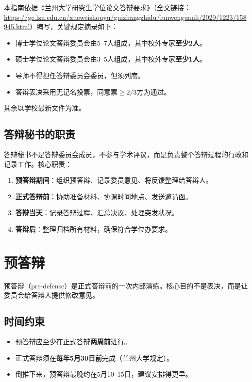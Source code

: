 \documentclass[12pt,a4paper,openany]{ctexbook}
\begin{document}
本指南依据《兰州大学研究生学位论文答辩要求》（全文链接：\url{https://ge.lzu.edu.cn/xueweishouyu/guizhangzhidu/lunwenguanli/2020/1223/158945.html}）编写，关键规定摘录如下：

\begin{itemize}
  \item 博士学位论文答辩委员会由5--7人组成，其中校外专家\textbf{至少2人}。
  \item 硕士学位论文答辩委员会由3--5人组成，其中校外专家\textbf{至少1人}。
  \item 导师不得担任答辩委员会委员，但须列席。
  \item 答辩表决采用无记名投票，同意票$\geq 2/3$方为通过。
\end{itemize}

其余以学校最新文件为准。

\section{答辩秘书的职责}

答辩秘书不是答辩委员会成员，不参与学术评议，而是负责整个答辩过程的行政和记录工作。核心职责：

\begin{enumerate}
  \item \textbf{预答辩期间}：组织预答辩、记录委员意见、将反馈整理给答辩人。
  \item \textbf{正式答辩前}：协助准备材料、协调时间地点、发送邀请函。
  \item \textbf{答辩当天}：记录答辩过程、汇总决议、处理突发状况。
  \item \textbf{答辩后}：整理归档所有材料，确保符合学位办要求。
\end{enumerate}

\chapter{预答辩}

预答辩（pre-defense）是正式答辩前的一次内部演练。核心目的不是表决，而是让委员会给答辩人提供修改意见。

\section{时间约束}

\begin{itemize}
  \item 预答辩应至少在正式答辩\textbf{两周前}进行。
  \item 正式答辩须在\textbf{每年5月30日前}完成（兰州大学规定）。
  \item 倒推下来，预答辩最晚约在5月10--15日，建议安排得更早。
\end{itemize}
\end{document}
